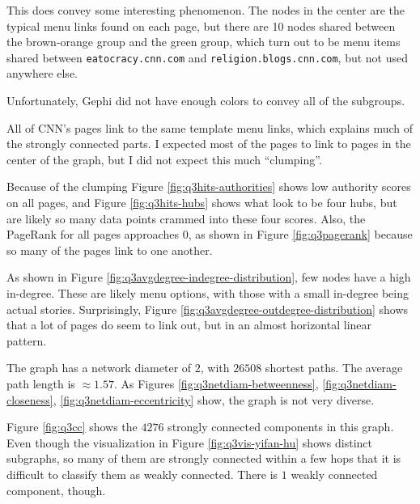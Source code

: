 \documentclass[letterpaper,11pt]{article}
\begin{document}
This does convey some interesting phenomenon.  The nodes in the center are the typical menu links found on each page, but there are 10 nodes shared between the brown-orange group and the green group, which turn out to be menu items shared between \verb+eatocracy.cnn.com+ and \verb+religion.blogs.cnn.com+, but not used anywhere else.

Unfortunately, Gephi did not have enough colors to convey all of the subgroups.

All of CNN's pages link to the same template menu links, which explains much of the strongly connected parts.  I expected most of the pages to link to pages in the center of the graph, but I did not expect this much ``clumping''.

Because of the clumping Figure \ref{fig:q3hits-authorities} shows low authority scores on all pages, and Figure \ref{fig:q3hits-hubs} shows what look to be four hubs, but are likely so many data points crammed into these four scores.  Also, the PageRank for all pages approaches $0$, as shown in Figure \ref{fig:q3pagerank} because so many of the pages link to one another.

As shown in Figure \ref{fig:q3avgdegree-indegree-distribution}, few nodes have a high in-degree.  These are likely menu options, with those with a small in-degree being actual stories.  Surprisingly, Figure \ref{fig:q3avgdegree-outdegree-distribution} shows that a lot of pages do seem to link out, but in an almost horizontal linear pattern.

The graph has a network diameter of $2$, with $26508$ shortest paths.  The average path length is $\approx 1.57$.  As Figures \ref{fig:q3netdiam-betweenness}, \ref{fig:q3netdiam-closeness}, \ref{fig:q3netdiam-eccentricity} show, the graph is not very diverse.

Figure \ref{fig:q3cc} shows the $4276$ strongly connected components in this graph.  Even though the visualization in Figure \ref{fig:q3vis-yifan-hu} shows distinct subgraphs, so many of them are strongly connected within a few hops that it is difficult to classify them as weakly connected.  There is $1$ weakly connected component, though.
\end{document}

